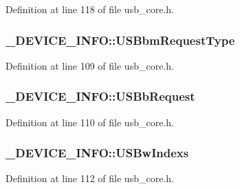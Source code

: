 Definition at line 118 of file usb\-\_\-core.\-h.

\hypertarget{struct___d_e_v_i_c_e___i_n_f_o_aa6c4e2ccb90731a53b4ba9b68ec8dca1}{
\subsubsection[{U\-S\-Bbm\-Request\-Type}]{ \-\_\-\-D\-E\-V\-I\-C\-E\-\_\-\-I\-N\-F\-O\-::\-U\-S\-Bbm\-Request\-Type}}\label{struct___d_e_v_i_c_e___i_n_f_o_aa6c4e2ccb90731a53b4ba9b68ec8dca1}


Definition at line 109 of file usb\-\_\-core.\-h.

\hypertarget{struct___d_e_v_i_c_e___i_n_f_o_a9f741f45aaef97ec60cc0c31eed606f1}{
\subsubsection[{U\-S\-Bb\-Request}]{ \-\_\-\-D\-E\-V\-I\-C\-E\-\_\-\-I\-N\-F\-O\-::\-U\-S\-Bb\-Request}}\label{struct___d_e_v_i_c_e___i_n_f_o_a9f741f45aaef97ec60cc0c31eed606f1}


Definition at line 110 of file usb\-\_\-core.\-h.

\hypertarget{struct___d_e_v_i_c_e___i_n_f_o_a7814966767a83ab0f0152a018c566e44}{
\subsubsection[{U\-S\-Bw\-Indexs}]{ \-\_\-\-D\-E\-V\-I\-C\-E\-\_\-\-I\-N\-F\-O\-::\-U\-S\-Bw\-Indexs}}\label{struct___d_e_v_i_c_e___i_n_f_o_a7814966767a83ab0f0152a018c566e44}


Definition at line 112 of file usb\-\_\-core.\-h.

